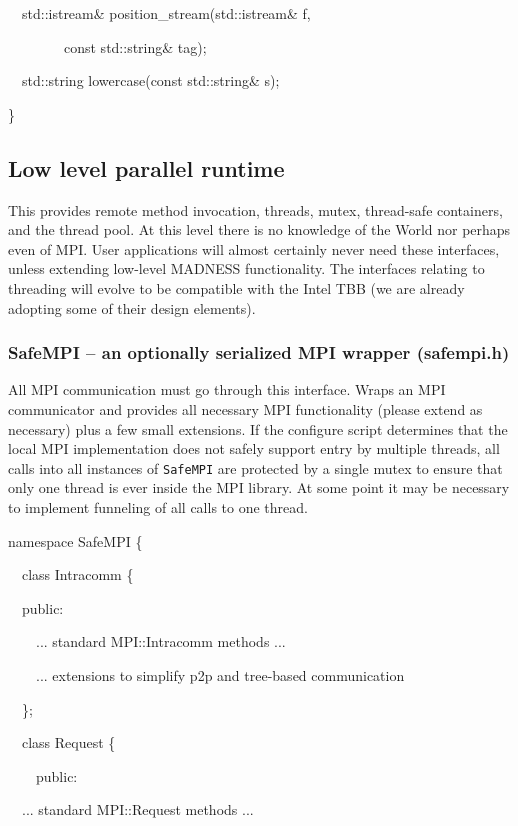 \documentclass[letterpaper]{article}
\begin{document}
{\ttfamily
\ \ std::istream\& position\_stream(std::istream\& f, }

{\ttfamily
\ \ \ \ \ \ \ \ const std::string\& tag);}

{\ttfamily
\ \ std::string lowercase(const std::string\& s);}

{\ttfamily
\}}

\subsection{Low level parallel runtime}
This provides remote method invocation, threads, mutex, thread-safe containers, and the thread pool. At this level there
is no knowledge of the World nor perhaps even of MPI. User applications will almost certainly never need these
interfaces, unless extending low-level MADNESS functionality. The interfaces relating to threading will evolve to be
compatible with the Intel TBB (we are already adopting some of their design elements).

\subsubsection{SafeMPI -- an optionally serialized MPI wrapper (safempi.h)}
All MPI communication must go through this interface. Wraps an MPI communicator and provides all necessary MPI
functionality (please extend as necessary) plus a few small extensions. If the configure script determines that the
local MPI implementation does not safely support entry by multiple threads, all calls into all instances of
\texttt{SafeMPI} are protected by a single mutex to ensure that only one thread is ever inside the MPI library. At some
point it may be necessary to implement funneling of all calls to one thread.

{\ttfamily
namespace SafeMPI \{}

{\ttfamily
\ \ class Intracomm \{}

{\ttfamily
\ \ public:}

{\ttfamily
\ \ \ \ ... standard MPI::Intracomm methods ...}

{\ttfamily
\ \ \ \ ... extensions to simplify p2p and tree-based communication}

{\ttfamily
\ \ \};}


\bigskip

{\ttfamily
\ \ class Request \{}

{\ttfamily
\ \ \ \ public:}

{\ttfamily
\ \ ... standard MPI::Request methods ...}
\end{document}
